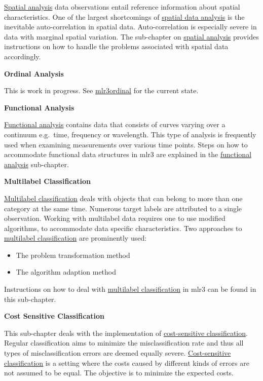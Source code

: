 \documentclass[]{scrbook}
\providecommand{\tightlist}{%
  \setlength{\itemsep}{0pt}\setlength{\parskip}{0pt}}
\begin{document}
\protect\hyperlink{spatial}{Spatial analysis} data observations entail reference information about spatial characteristics.
One of the largest shortcomings of \protect\hyperlink{spatial}{spatial data analysis} is the inevitable auto-correlation in spatial data.
Auto-correlation is especially severe in data with marginal spatial variation.
The sub-chapter on \protect\hyperlink{spatial}{spatial analysis} provides instructions on how to handle the problems associated with spatial data accordingly.

\textbf{Ordinal Analysis}

This is work in progress.
See \href{https://github.com/mlr-org/mlr3ordinal}{mlr3ordinal} for the current state.

\textbf{Functional Analysis}

\protect\hyperlink{functional}{Functional analysis} contains data that consists of curves varying over a continuum e.g.~time, frequency or wavelength.
This type of analysis is frequently used when examining measurements over various time points.
Steps on how to accommodate functional data structures in mlr3 are explained in the \protect\hyperlink{functional}{functional analysis} sub-chapter.

\textbf{Multilabel Classification}

\protect\hyperlink{multilabel}{Multilabel classification} deals with objects that can belong to more than one category at the same time.
Numerous target labels are attributed to a single observation.
Working with multilabel data requires one to use modified algorithms, to accommodate data specific characteristics.
Two approaches to \protect\hyperlink{multilabel}{multilabel classification} are prominently used:

\begin{itemize}
\tightlist
\item
  The problem transformation method
\item
  The algorithm adaption method
\end{itemize}

Instructions on how to deal with \protect\hyperlink{multilabel}{multilabel classification} in mlr3 can be found in this sub-chapter.

\textbf{Cost Sensitive Classification}

This sub-chapter deals with the implementation of \protect\hyperlink{cost-sens}{cost-sensitive classification}.
Regular classification aims to minimize the misclassification rate and thus all types of misclassification errors are deemed equally severe.
\protect\hyperlink{cost-sens}{Cost-sensitive classification} is a setting where the costs caused by different kinds of errors are not assumed to be equal.
The objective is to minimize the expected costs.
\end{document}
